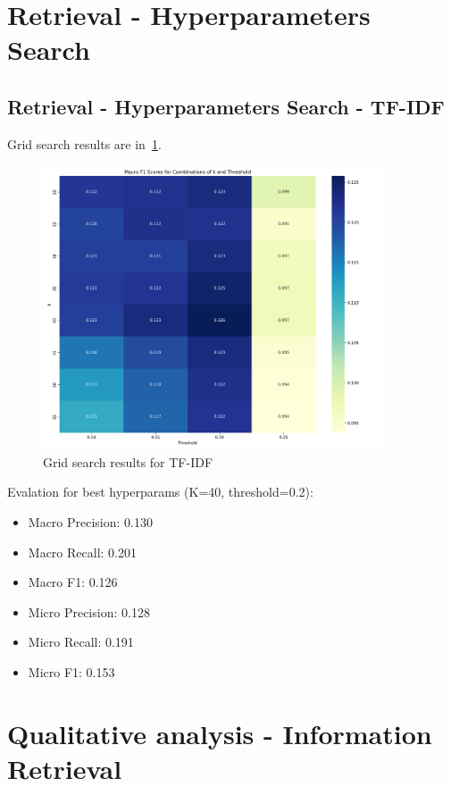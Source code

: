 \documentclass[a4paper,11pt]{article}
\begin{document}
\section{Retrieval - Hyperparameters Search}

\subsection{Retrieval - Hyperparameters Search - TF-IDF}
Grid search results are in~\ref{fig:parameter_heatmap_tfidf}.
\begin{figure}
    \centering
    \includegraphics[width=0.9\textwidth]{ir_parameter_heatmap1747239585.png}
    \caption{Grid search results for TF-IDF}
    \label{fig:parameter_heatmap_tfidf}
\end{figure}

Evalation for best hyperparams (K=40, threshold=0.2):
\begin{itemize}
    \item Macro Precision: 0.130
    \item Macro Recall: 0.201
    \item Macro F1: 0.126
    \item Micro Precision: 0.128
    \item Micro Recall: 0.191
    \item Micro F1: 0.153
\end{itemize}


\section{Qualitative analysis - Information Retrieval}
\end{document}
